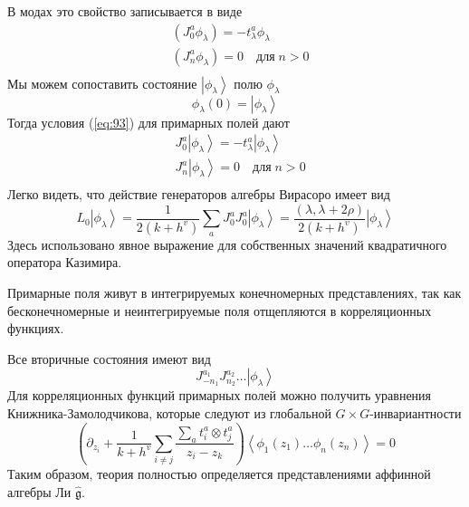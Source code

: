 \documentclass[a4paper,12pt]{article}
\theoremstyle{definition} \newtheorem{Def}{Definition}
\begin{document}
В модах это свойство записывается в виде
\begin{equation}
  \label{eq:93}
  \begin{aligned}
    & (J_0^a \phi_{\lambda})=-t^a_{\lambda}\phi_{\lambda}\\
    & (J^a_n\phi_{\lambda})=0\quad \mbox{для}\; n>0\\
  \end{aligned}
\end{equation}
Мы можем сопоставить состояние $\left|\phi_{\lambda}\right>$ полю $\phi_{\lambda}$
  \begin{equation}
    \label{eq:94}
    \phi_{\lambda}(0)=\left|\phi_{\lambda}\right>
  \end{equation}
Тогда условия (\ref{eq:93}) для примарных полей дают
\begin{equation}
  \label{eq:95}
  \begin{aligned}
    & J_0^a\left|\phi_{\lambda}\right>=-t^a_{\lambda}\left|\phi_{\lambda}\right>\\
    & J^a_n\left|\phi_{\lambda}\right>=0 \quad \mbox{для}\; n>0 \\
  \end{aligned}
\end{equation}
Легко видеть, что действие генераторов алгебры Вирасоро имеет вид
\begin{equation}
  \label{eq:96}
  L_0\left|\phi_{\lambda}\right>=\frac{1}{2(k+h^v)}\sum_aJ^a_0J^a_0\left|\phi_{\lambda}\right>=\frac{(\lambda,\lambda+2\rho)}{2(k+h^v)}\left|\phi_{\lambda}\right>
\end{equation}
Здесь использовано явное выражение для собственных значений квадратичного оператора Казимира.

Примарные поля живут в интегрируемых конечномерных представлениях, так как бесконечномерные и неинтегрируемые поля отщепляются в корреляционных функциях.

Все вторичные состояния имеют вид
\begin{equation}
  \label{eq:97}
  J^{a_1}_{-n_1}J^{a_2}_{n_2}\dots\left|\phi_{\lambda}\right>
\end{equation}
Для корреляционных функций примарных полей можно получить уравнения Книжника-Замолодчикова, которые следуют из глобальной $G\times G$-инвариантности
\begin{equation}
  \label{eq:98}
  \left(\partial_{z_i}+\frac{1}{k+h^v}\sum_{i\neq j}\frac{\sum_a t^a_i\otimes t^a_j}{z_i-z_k}\right)
  \left<\phi_1(z_1)\dots \phi_n(z_n)\right>=0
\end{equation}
Таким образом, теория полностью определяется представлениями аффинной алгебры Ли $\hat{\mathfrak{g}} $.
\end{document}
